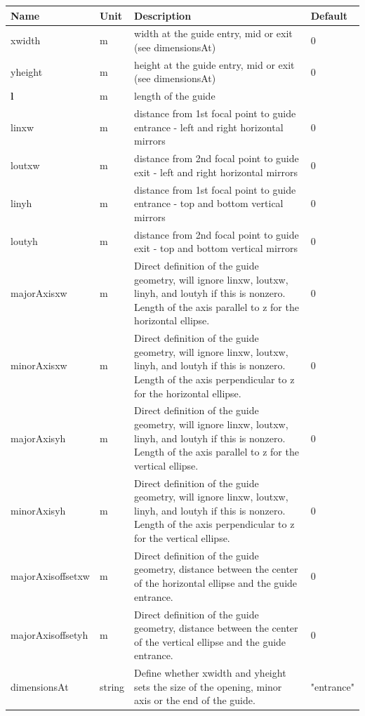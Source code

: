 \begin{longtable}{p{}p{}p{}p{}}
\toprule
\textbf{Name} & \textbf{Unit} & \textbf{Description} & \textbf{Default} \\
\midrule
\endhead
xwidth & m & width at the guide entry, mid or exit (see dimensionsAt) & 0 \\
yheight & m & height at the guide entry, mid or exit (see dimensionsAt) & 0 \\
\textbf{l} & m & length of the guide &  \\
linxw & m & distance from 1st focal point to guide entrance - left and right horizontal mirrors & 0 \\
loutxw & m & distance from 2nd focal point to guide exit - left and right horizontal mirrors & 0 \\
linyh & m & distance from 1st focal point to guide entrance - top and bottom vertical mirrors & 0 \\
loutyh & m & distance from 2nd focal point to guide exit - top and bottom vertical mirrors & 0 \\
majorAxisxw & m & Direct definition of the guide geometry, will ignore linxw, loutxw, linyh, and loutyh if this is nonzero. Length of the axis parallel to z for the horizontal ellipse. & 0 \\
minorAxisxw & m & Direct definition of the guide geometry, will ignore linxw, loutxw, linyh, and loutyh if this is nonzero. Length of the axis perpendicular to z for the horizontal ellipse. & 0 \\
majorAxisyh & m & Direct definition of the guide geometry, will ignore linxw, loutxw, linyh, and loutyh if this is nonzero. Length of the axis parallel to z for the vertical ellipse. & 0 \\
minorAxisyh & m & Direct definition of the guide geometry, will ignore linxw, loutxw, linyh, and loutyh if this is nonzero. Length of the axis perpendicular to z for the vertical ellipse. & 0 \\
majorAxisoffsetxw & m & Direct definition of the guide geometry, distance between the center of the horizontal ellipse and the guide entrance. & 0 \\
majorAxisoffsetyh & m & Direct definition of the guide geometry, distance between the center of the vertical ellipse and the guide entrance. & 0 \\
dimensionsAt & string & Define whether xwidth and yheight sets the size of the opening, minor axis or the end of the guide. & "entrance" \\

\end{longtable}
